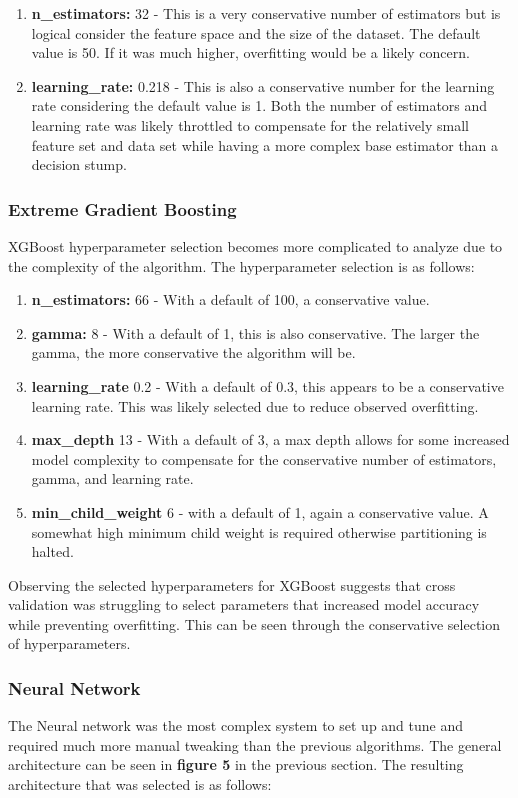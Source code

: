 \documentclass[11pt]{article}
\begin{document}
	\begin{enumerate}
		\item \textbf{n\_estimators:} 32 - This is a very conservative number of estimators but is logical consider the feature space and the size of the dataset. The default value is 50. If it was much higher, overfitting would be a likely concern.
		\item \textbf{learning\_rate:} 0.218 - This is also a conservative number for the learning rate considering the default value is 1. Both the number of estimators and learning rate was likely throttled to compensate for the relatively small feature set and data set while having a more complex base estimator than a decision stump.
	\end{enumerate}
	\subsubsection{Extreme Gradient Boosting}
	XGBoost hyperparameter selection becomes more complicated to analyze due to the complexity of the algorithm. The hyperparameter selection is as follows:
	
	\begin{enumerate}
		\item \textbf{n\_estimators:} 66 - With a default of 100, a conservative value.
		\item \textbf{gamma:} 8 - With a default of 1, this is also conservative. The larger the gamma, the more conservative the algorithm will be. 
		\item \textbf{learning\_rate} 0.2 - With a default of 0.3, this appears to be a conservative learning rate. This was likely selected due to reduce observed overfitting.
		\item \textbf{max\_depth} 13 - With a default of 3, a max depth allows for some increased model complexity to compensate for the conservative number of estimators, gamma, and learning rate.
		\item \textbf{min\_child\_weight} 6 - with a default of 1, again a conservative value. A somewhat high minimum child weight is required otherwise partitioning is halted.
	\end{enumerate}
	
	Observing the selected hyperparameters for XGBoost suggests that cross validation was struggling to select parameters that increased model accuracy while preventing overfitting. This can be seen through the conservative selection of hyperparameters. 
	\subsubsection{Neural Network}
	The Neural network was the most complex system to set up and tune and required much more manual tweaking than the previous algorithms. The general architecture can be seen in \textbf{figure 5} in the previous section. The resulting architecture that was selected is as follows:
	
\end{document}
